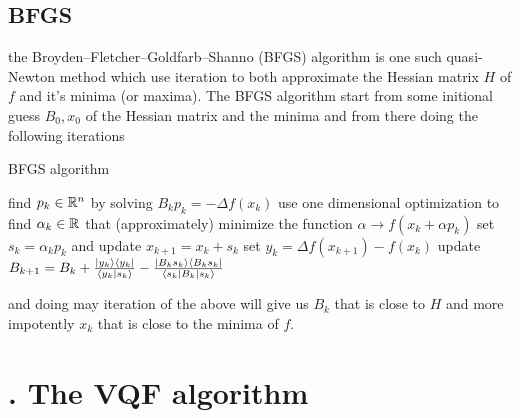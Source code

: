 \documentclass[12pt]{amsart}
\numberwithin{equation}{section}
\theoremstyle{definition}
\begin{document}
\subsection{ BFGS}
the Broyden–Fletcher–Goldfarb–Shanno (BFGS) algorithm is one such quasi-Newton method which use iteration to both approximate the Hessian matrix $H$ of $f$ and it's minima (or maxima). The BFGS algorithm start from some initional guess $B_0, x_0$ of the Hessian matrix and the minima and from there doing the following iterations    
\begin{algorithm}[hbt!]
\caption{BFGS algorithm}\label{alg:cap}
\begin{algorithmic}[1]
\State find $p_k\in \Bbb{R}^n$ by solving $B_kp_k=-\Delta f(x_k)$
\State use one dimensional optimization to find $\alpha_k\in \Bbb{R}$ that (approximately) minimize the function $\alpha \to f(x_k+\alpha p_k)$  
\State set $s_k=\alpha_kp_k$ and update $x_{k+1}=x_k+s_k$
\State set $y_k=\Delta f(x_{k+1})-f(x_k)$
\State update $B_{k+1}=B_k+\frac{\ket{y_k}\bra{y_k}}{\braket{y_k}{s_k}}-\frac{\ket{B_ks_k}\bra{B_ks_k}}{\bra{s_k}B_k\ket{s_k}}$
\end{algorithmic}
\end{algorithm}
and doing may iteration of the above will give us $B_k$ that is close to $H$ and more impotently $x_k$ that is close to the minima of $f$.   





\section{. The VQF algorithm }
\end{document}
